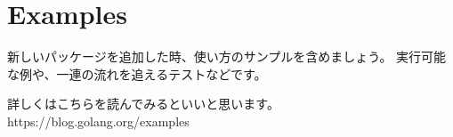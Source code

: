 \section{Examples}

新しいパッケージを追加した時、使い方のサンプルを含めましょう。 実行可能な例や、一連の流れを追えるテストなどです。

詳しくはこちらを読んでみるといいと思います。https:\//\//blog.golang.org\//examples
